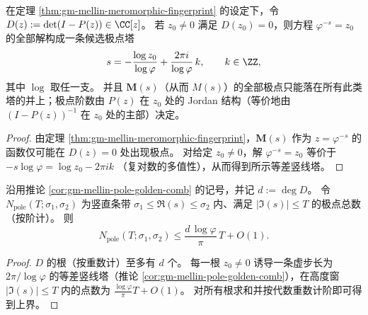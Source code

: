 \begin{corollary}\label{cor:gm-mellin-pole-golden-comb}
在定理 \ref{thm:gm-mellin-meromorphic-fingerprint} 的设定下，令
\(
D(z):=\det(I-P(z))\in\CC[z]
\)。
若 \(z_0\neq 0\) 满足 \(D(z_0)=0\)，则方程 \(\varphi^{-s}=z_0\) 的全部解构成一条候选极点塔
\[
s=-\frac{\log z_0}{\log\varphi}+\frac{2\pi i}{\log\varphi}\,k,\qquad k\in\ZZ,
\]
其中 \(\log\) 取任一支。
并且 \(\mathbf{M}(s)\)（从而 \(M(s)\)）的全部极点只能落在所有此类塔的并上；极点阶数由 \(P(z)\) 在 \(z_0\) 处的 Jordan 结构（等价地由 \((I-P(z))^{-1}\) 在 \(z_0\) 处的主部）决定。
\end{corollary}

\begin{proof}
由定理 \ref{thm:gm-mellin-meromorphic-fingerprint}，\(\mathbf{M}(s)\) 作为 \(z=\varphi^{-s}\) 的函数仅可能在 \(D(z)=0\) 处出现极点。
对给定 \(z_0\neq 0\)，解 \(\varphi^{-s}=z_0\) 等价于
\(
-s\log\varphi=\log z_0-2\pi i k
\)
（复对数的多值性），从而得到所示等差竖线塔。
\end{proof}

\begin{corollary}\label{cor:gm-mellin-pole-count-linear}
沿用推论 \ref{cor:gm-mellin-pole-golden-comb} 的记号，并记 \(d:=\deg D\)。
令 \(N_{\mathrm{pole}}(T;\sigma_1,\sigma_2)\) 为竖直条带 \(\sigma_1\le \Re(s)\le \sigma_2\) 内、满足 \(|\Im(s)|\le T\) 的极点总数（按阶计）。
则
\[
N_{\mathrm{pole}}(T;\sigma_1,\sigma_2)\le \frac{d\,\log\varphi}{\pi}\,T+O(1).
\]
\end{corollary}

\begin{proof}
\(D\) 的根（按重数计）至多有 \(d\) 个。
每一根 \(z_0\neq 0\) 诱导一条虚步长为 \(2\pi/\log\varphi\) 的等差竖线塔（推论 \ref{cor:gm-mellin-pole-golden-comb}），在高度窗 \(|\Im(s)|\le T\) 内的点数为 \(\frac{\log\varphi}{\pi}T+O(1)\)。
对所有根求和并按代数重数计阶即可得到上界。
\end{proof}

